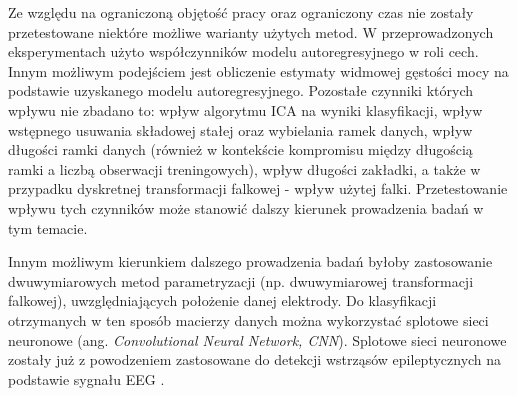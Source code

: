 \documentclass[notitlepage]{report}
\begin{document}
Ze względu na ograniczoną objętość pracy oraz ograniczony czas nie zostały przetestowane niektóre możliwe warianty użytych metod. W przeprowadzonych eksperymentach użyto współczynników modelu autoregresyjnego w roli cech. Innym możliwym podejściem jest obliczenie estymaty widmowej gęstości mocy na podstawie uzyskanego modelu autoregresyjnego. Pozostałe czynniki których wpływu nie zbadano to: wpływ algorytmu ICA na wyniki klasyfikacji, wpływ wstępnego usuwania składowej stałej oraz wybielania ramek danych, wpływ długości ramki danych (również w kontekście kompromisu między długością ramki a liczbą obserwacji treningowych), wpływ długości zakładki, a także w przypadku dyskretnej transformacji falkowej - wpływ użytej falki. Przetestowanie wpływu tych czynników może stanowić dalszy kierunek prowadzenia badań w tym temacie.

Innym możliwym kierunkiem dalszego prowadzenia badań byłoby zastosowanie dwuwymiarowych metod parametryzacji (np. dwuwymiarowej transformacji falkowej), uwzględniających położenie danej elektrody. Do klasyfikacji otrzymanych w ten sposób macierzy danych można wykorzystać splotowe sieci neuronowe (ang. \textit{Convolutional Neural Network, CNN}). Splotowe sieci neuronowe zostały już z powodzeniem zastosowane do detekcji wstrząsów epileptycznych na podstawie sygnału EEG \cite{acharya}.

\cleardoublepage
{}
{}
\printbibliography

\listoffigures%
\listoftables%
\end{document}

